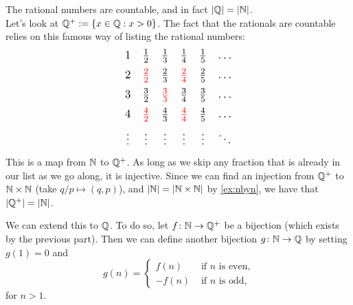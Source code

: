 \documentclass{article}
\begin{document}
\begin{example}
The rational numbers are countable, and in fact $|{\mathbb{Q}}| = |{\mathbb{N}}|$. \\
Let's look at ${\mathbb{Q}}^+ := \{ x \in {\mathbb{Q}} : x > 0\}$. The fact that the rationals are countable relies on this famous way of listing the rational numbers:
\begin{equation*}
\scalebox{1.2}{$
 \begin{array}{cccccc}
 1 & \frac{1}{2} & \frac{1}{3} & \frac{1}{4} &\frac{1}{5} &\ldots \\[0.5em]
 2 & \textcolor{red}{\frac{2}{2}} & \frac{2}{3} &\textcolor{red}{\frac{2}{4}} &\frac{2}{5} & \ldots \\[0.5em]
 3 & \frac{3}{2} & \textcolor{red}{\frac{3}{3}} &\frac{3}{4} &\frac{3}{5} &\ldots \\[0.5em]
 4 & \textcolor{red}{\frac{4}{2}} & \frac{4}{3} & \textcolor{red}{\frac{4}{4}} &\frac{4}{5} &\ldots \\[0.5em]
 \vdots & \vdots & \vdots & \vdots &\vdots & \ddots 
\end{array}  $} 
\end{equation*}
This is a map from ${\mathbb{N}}$ to ${\mathbb{Q}}^+$. As long as we skip any fraction that is already in our list as we go along, it is injective.  Since we can find an injection from ${\mathbb{Q}}^+$ to ${\mathbb{N}} \times {\mathbb{N}}$ (take $q/p \mapsto (q,p)$), and $|{\mathbb{N}}| = |{\mathbb{N}} \times {\mathbb{N}}|$ by \cref{ex:nbyn}, we have that $|{\mathbb{Q}}^+| = |{\mathbb{N}}|$. 

We can extend this to ${\mathbb{Q}}$. To do so, let $f\colon {\mathbb{N}} \to {\mathbb{Q}}^+$ be a bijection (which exists by the previous part). Then we can define another bijection $g\colon {\mathbb{N}} \to {\mathbb{Q}}$ by setting $g(1) = 0$ and 
\begin{equation*}
    g(n) =\begin{cases}
    f(n) & \text{ if } n \text{ is even,} \\
    -f(n) & \text{ if }  n \text{ is odd},
    \end{cases}
\end{equation*}
for $n>1$.
\end{example}
\end{document}
